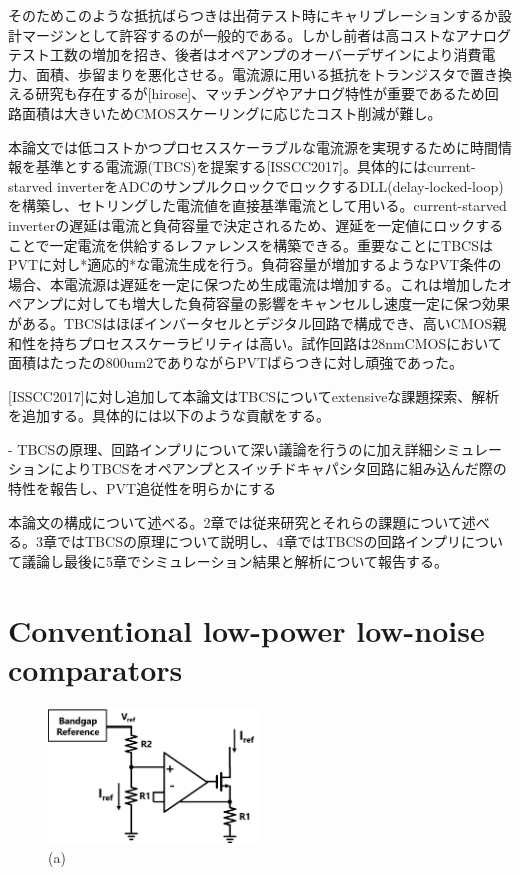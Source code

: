 \documentclass[letterpaper, 10 pt, conference]{ieeeconf}  %
\begin{document}
そのためこのような抵抗ばらつきは出荷テスト時にキャリブレーションするか設計マージンとして許容するのが一般的である。しかし前者は高コストなアナログテスト工数の増加を招き、後者はオペアンプのオーバーデザインにより消費電力、面積、歩留まりを悪化させる。電流源に用いる抵抗をトランジスタで置き換える研究も存在するが[hirose]、マッチングやアナログ特性が重要であるため回路面積は大きいためCMOSスケーリングに応じたコスト削減が難し。

本論文では低コストかつプロセススケーラブルな電流源を実現するために時間情報を基準とする電流源(TBCS)を提案する[ISSCC2017]。具体的にはcurrent-starved inverterをADCのサンプルクロックでロックするDLL(delay-locked-loop)を構築し、セトリングした電流値を直接基準電流として用いる。current-starved inverterの遅延は電流と負荷容量で決定されるため、遅延を一定値にロックすることで一定電流を供給するレファレンスを構築できる。重要なことにTBCSはPVTに対し*適応的*な電流生成を行う。負荷容量が増加するようなPVT条件の場合、本電流源は遅延を一定に保つため生成電流は増加する。これは増加したオペアンプに対しても増大した負荷容量の影響をキャンセルし速度一定に保つ効果がある。TBCSはほぼインバータセルとデジタル回路で構成でき、高いCMOS親和性を持ちプロセススケーラビリティは高い。試作回路は28nmCMOSにおいて面積はたったの800um2でありながらPVTばらつきに対し頑強であった。

[ISSCC2017]に対し追加して本論文はTBCSについてextensiveな課題探索、解析を追加する。具体的には以下のような貢献をする。

- TBCSの原理、回路インプリについて深い議論を行うのに加え詳細シミュレーションによりTBCSをオペアンプとスイッチドキャパシタ回路に組み込んだ際の特性を報告し、PVT追従性を明らかにする

本論文の構成について述べる。2章では従来研究とそれらの課題について述べる。3章ではTBCSの原理について説明し、4章ではTBCSの回路インプリについて議論し最後に5章でシミュレーション結果と解析について報告する。

\section{Conventional low-power low-noise comparators}
\begin{figure}[!]
\centering
 \includegraphics[width=0.5\textwidth]{figs/fig1.png}
  \caption{(a) 
}
\label{fig2}
\end{figure}
\end{document}
